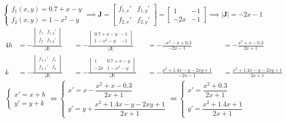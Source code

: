 \newpage
{}
\begin{equation*}
	\begin{cases}
		f_1(x,y)=0.7+x-y\\
		f_2(x,y)=1-x^2-y
	\end{cases}
	\implies
	\mathbf{J}=\begin{bmatrix}
  		f_{1,x}' & f_{1,y}'\\
  		f_{2,x}' & f_{2,y}'
	\end{bmatrix}=\begin{bmatrix}
  		1   & -1\\
  		-2x & -1
	\end{bmatrix}
	\implies
	|\mathbf{J}|=-2x-1
\end{equation*}
\begin{alignat*}{4}
	h&=-\frac{
		\begin{vmatrix}
			f_1 & f_{1,y}' \\
			f_2 & f_{2,y}'
		\end{vmatrix}}
		{|\mathbf{J}|}
	   &&=-\frac{
		\begin{vmatrix}
			0.7+x-y & -1 \\
			1-x^2-y & -1
		\end{vmatrix}}
		{|\mathbf{J}|}
	   &&=-\frac{-x^2-x+0.3}{-2x-1}
	   &&=-\frac{x^2+x-0.3}{2x+1} \\
	k&=-\frac{
		\begin{vmatrix}
			f_{1,x}' & f_1 \\
			f_{2,x}' & f_2
		\end{vmatrix}}
		{|\mathbf{J}|}
	   &&=-\frac{
		\begin{vmatrix}
			 1  & 0.7+x-y \\
			-2x & 1-x^2-y
		\end{vmatrix}}
		{|\mathbf{J}|}
	   &&=-\frac{x^2+1.4x-y-2x y+1}{-2x-1}
	   &&=\frac{x^2+1.4x-y-2x y+1}{2x+1}
\end{alignat*}
\begin{equation*}
	\begin{cases}
		x'=x+h\\
		y'=y+k
	\end{cases}
	\iff
	\begin{cases}
		x'=x-\dfrac{x^2+x-0.3}{2x+1}\\[1em]
		y'=y+\dfrac{x^2+1.4x-y-2x y+1}{2x+1}
	\end{cases}
	\iff
	\begin{cases}
		x'=\dfrac{x^2+0.3}{2x+1}\\[1em]
		y'=\dfrac{x^2+1.4x+1}{2x+1}
	\end{cases}
\end{equation*}
